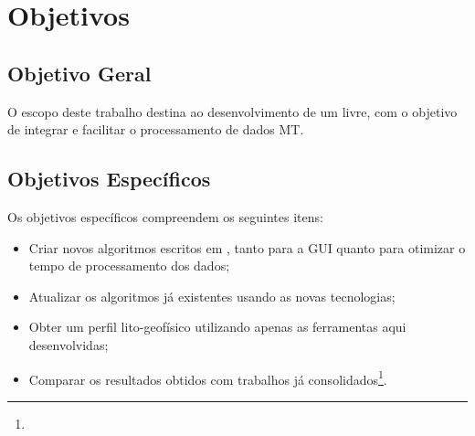 \chapter{Objetivos}
	\section{Objetivo Geral}
        O escopo deste trabalho destina ao desenvolvimento de um  livre, com o objetivo de integrar e facilitar o processamento de dados MT.
    
    \section{Objetivos Específicos}
        
        Os objetivos específicos compreendem os seguintes itens:
        
        \begin{itemize}
            \item Criar novos algoritmos escritos em \Python, tanto para a GUI quanto para otimizar o tempo de processamento dos dados;
            \item Atualizar os algoritmos já existentes usando as novas tecnologias;
            \item Obter um perfil lito-geofísico utilizando apenas as ferramentas aqui desenvolvidas;
            \item Comparar os resultados obtidos com trabalhos já consolidados\footnote{}.
        \end{itemize}

